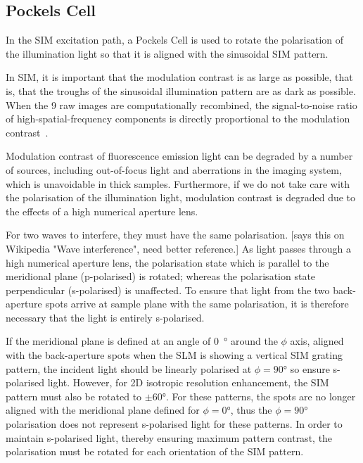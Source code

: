 \subsection{Pockels Cell} \label{sec:lagsim-pockels}
In the SIM excitation path, a Pockels Cell is used to rotate the polarisation of the illumination light so that it is aligned with the sinusoidal SIM pattern. 

In SIM, it is important that the modulation contrast is as large as possible, that is, that the troughs of the sinusoidal illumination pattern are as dark as possible.
When the 9 raw images are computationally recombined, the signal-to-noise ratio of high-spatial-frequency components is directly proportional to the modulation contrast~\cite{oholleran2012polarization}.

Modulation contrast of fluorescence emission light can be degraded by a number of sources, including out-of-focus light and aberrations in the imaging system, which is unavoidable in thick samples. 
Furthermore, if we do not take care with the polarisation of the illumination light,  modulation contrast is degraded due to the effects of a high numerical aperture lens. 

For two waves to interfere, they must have the same polarisation. [says this on Wikipedia "Wave interference", need better reference.]
As light passes through a high numerical aperture lens, the polarisation state which is parallel to the meridional plane (p-polarised) is rotated; whereas the polarisation state perpendicular (s-polarised) is unaffected. 
To ensure that light from the two back-aperture spots arrive at sample plane with the same polarisation, it is therefore necessary that the light is entirely s-polarised. 

If the meridional plane is defined at an angle of \SI{0}{\degree} around the $\phi$ axis, aligned with the back-aperture spots when the SLM is showing a vertical SIM grating pattern, the incident light should be linearly polarised at $\phi=90\si{\degree}$ so ensure s-polarised light. 
However, for 2D isotropic resolution enhancement, the SIM pattern must also be rotated to $\pm60\si{\degree}$. 
For these patterns, the spots are no longer aligned with the meridional plane defined for $\phi=0\si{\degree}$, thus the $\phi=90\si{\degree}$ polarisation does not represent s-polarised light for these patterns. 
In order to maintain s-polarised light, thereby ensuring maximum pattern contrast, the polarisation must be rotated for each orientation of the SIM pattern. 

